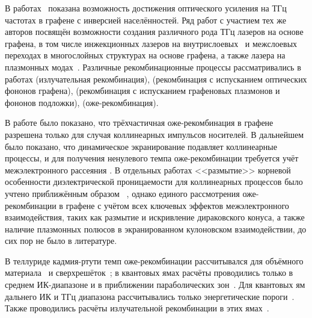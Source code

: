 {\previouswork}
В работах~\cite{graphene-negative_conductivity, graphene-Drude_e-e_scattering} показана возможность достижения оптического усиления на ТГц частотах в графене с инверсией населённостей. Ряд работ с участием тех же авторов посвящён возможности создания различного рода ТГц лазеров на основе графена, в том числе инжекционных лазеров на внутрислоевых~\cite{graphene-injection_laser_theory} и межслоевых~\cite{graphene-interlayer_laser} переходах в многослойных структурах на основе графена, а также лазера на плазмонных модах~\cite{graphene-spaser}. Различные рекомбинационные процессы рассматривались в работах \cite{graphene-radiative} (излучательная рекомбинация), \cite{Rana-phonons} (рекомбинация с испусканием оптических фононов графена), \cite{Rana-plasmons} (рекомбинация с испусканием графеновых плазмонов и фононов подложки), \cite{Rana-Auger,Tomadin-theory,Malic-dynamic} (оже-рекомбинация).

В работе \cite{Rana-Auger} было показано, что трёхчастичная оже-рекомбинация в графене разрешена только для случая коллинеарных импульсов носителей. В дальнейшем было показано, что динамическое экранирование подавляет коллинеарные процессы, и для получения ненулевого темпа оже-рекомбинации требуется учёт межэлектронного рассеяния \cite{Tomadin-theory}. В отдельных работах <<размытие>> корневой особенности диэлектрической проницаемости для коллинеарных процессов было учтено приближённым образом ~\cite{Malic-dynamic,Tomadin-theory}, однако единого рассмотрения оже-рекомбинации в графене с учётом всех ключевых эффектов межэлектронного взаимодействия, таких как размытие и искривление дираковского конуса, а также наличие плазмонных полюсов в экранированном кулоновском взаимодействии, до сих пор не было в литературе.

В теллуриде кадмия-ртути темп оже-рекомбинации рассчитывался для объёмного материала~\cite{bulk_HgCdTe_Auger_1,bulk_HgCdTe_Auger_2,bulk_HgCdTe_Auger_3,Auger_Monte_Carlo_phase_space_restriction,bulk_HgCdTe_Auger_5,bulk_HgCdTe_Auger_6}  и сверхрешёток~\cite{normal_vs_inverted,HgCdTe_superlattice_laser_threshold}; в квантовых ямах расчёты проводились только в среднем ИК-диапазоне и в приближении параболических зон~\cite{MIR_HgCdTe_QW_Auger}. Для квантовых ям дальнего ИК и ТГц диапазона рассчитывались только энергетические пороги~\cite{HgCdTe_QW_Auger_thresholds1,HgCdTe_QW_Auger_thresholds2,HgCdTe_QW_Auger_thresholds3}. Также проводились расчёты излучательной рекомбинации в этих ямах~\cite{HgCdTe_QW_radiative}. 

